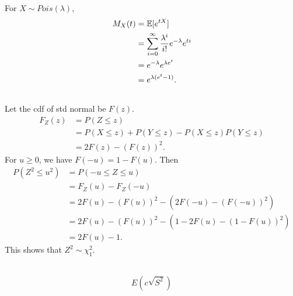 \subsubsection{} %

For $X\sim Pois(\lambda)$,
\begin{align}
    M_X(t)
        &= \mathbb{E}[e^{tX}] \\
        &= \sum_{i=0}^\infty \frac{\lambda^i}{i!}e^{-\lambda}e^{ti} \\
        &= e^{-\lambda}e^{\lambda e^t} \\
        &= e^{\lambda(e^t-1)}.
\end{align}


\subsection{} %

Let the cdf of std normal be $F(z)$.
\begin{align}
    F_Z(z)
        &= P(Z\le z) \\
        &= P(X\le z) + P(Y\le z) - P(X\le z)P(Y\le z) \\
        &= 2F(z) - (F(z))^2.
\end{align}
For $u\ge0$, we have $F(-u)=1-F(u)$. Then
\begin{align}
    P(Z^2\le u^2)
        &= P(-u\le Z\le u) \\
        &= F_Z(u) - F_Z(-u) \\
        &= 2F(u) - (F(u))^2 - (2F(-u) - (F(-u))^2) \\
        &= 2F(u) - (F(u))^2 - (1 - 2F(u) - (1 - F(u))^2) \\
        &= 2F(u) - 1.
\end{align}
This shows that $Z^2\sim \chi_1^2$.


\subsection{} %

\begin{align}
    E(c\sqrt{S^2})
\end{align}
